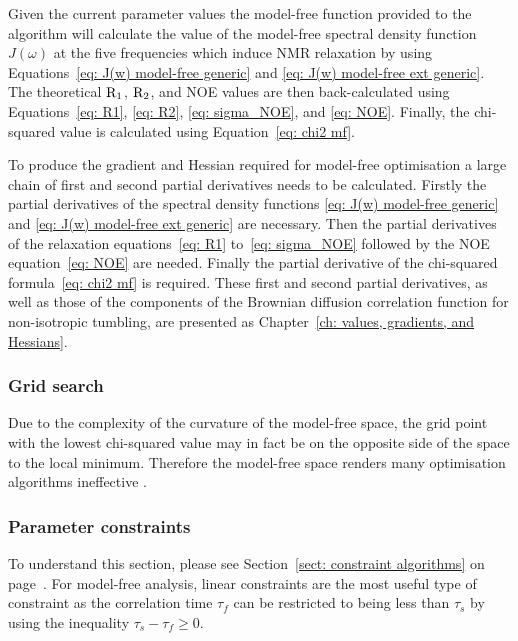 \begin{htmlonly}
\begin{htmlonly}
Given the current parameter values the model-free function provided to the algorithm will calculate the value of the model-free spectral density function $J(\omega)$ at the five frequencies which induce NMR relaxation by using Equations~\eqref{eq: J(w) model-free generic} and \eqref{eq: J(w) model-free ext generic}.
The theoretical $\mathrm{R}_1$, $\mathrm{R}_2$, and NOE values are then back-calculated using Equations~\eqref{eq: R1}, \eqref{eq: R2}, \eqref{eq: sigma_NOE}, and \eqref{eq: NOE}.
Finally, the chi-squared value is calculated using Equation~\eqref{eq: chi2 mf}.

To produce the gradient and Hessian required for model-free optimisation a large chain of first and second partial derivatives needs to be calculated.
Firstly the partial derivatives of the spectral density functions \eqref{eq: J(w) model-free generic} and \eqref{eq: J(w) model-free ext generic} are necessary.
Then the partial derivatives of the relaxation equations~\eqref{eq: R1} to~\eqref{eq: sigma_NOE} followed by the NOE equation~\eqref{eq: NOE} are needed.
Finally the partial derivative of the chi-squared formula~\eqref{eq: chi2 mf} is required.
These first and second partial derivatives, as well as those of the components of the Brownian diffusion correlation function for non-isotropic tumbling, are presented as Chapter~\ref{ch: values, gradients, and Hessians}.


\subsubsection{Grid search}

Due to the complexity of the curvature of the model-free space, the grid point with the lowest chi-squared value may in fact be on the opposite side of the space to the local minimum.
Therefore the model-free space renders many optimisation algorithms ineffective \citep{dAuvergneGooley08a}.


\subsubsection{Parameter constraints}

To understand this section, please see Section~\ref{sect: constraint algorithms} on page~\pageref{sect: constraint algorithms}.
For model-free analysis, linear constraints are the most useful type of constraint as the correlation time $\tau_f$ can be restricted to being less than $\tau_s$ by using the inequality $\tau_s - \tau_f \geqslant 0$.


\end{htmlonly}
\end{htmlonly}
